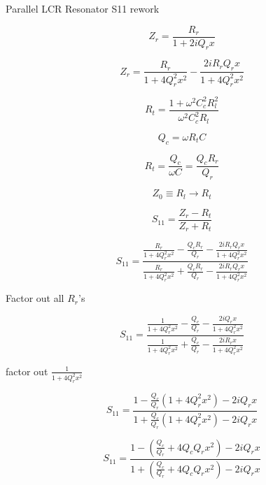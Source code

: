 \documentclass[12pt]{article}
\begin{document}
\setlength{\parindent}{0 pt}
\begin{center}
Parallel LCR Resonator S11 rework
\end{center}

\[
Z_{r} = \frac{R_{r}}{1 + 2iQ_r x}
\]

\[
Z_{r} = \frac{R_{r}}{1 + 4Q_r^2 x^2} - \frac{2 i R_r Q_r x}{1 + 4 Q_r^2 x^2}
\]

\[
R_t =\frac{1 + \omega^2 C_c^2 R_l^2}{\omega^2 C_c^2 R_l}
\]

\[
Q_c = \omega R_t C
\]

\[
R_t = \frac{Q_c}{\omega C} = \frac{Q_c R_{r}}{Q_{r}}
\]

\[
Z_0 \equiv R_l \rightarrow R_t
\]

\[
S_{11} = \frac{Z_{r} - R_t}{Z_{r} + R_t}
\]

\[
S_{11} = \frac{  \frac{R_{r}}{1 + 4Q_r^2 x^2} - \frac{Q_c R_{r}}{Q_{r}} - \frac{2 i R_r Q_r x}{1 + 4  Q_r^2 x^2}}{  \frac{R_{r}}{1 + 4Q_r^2 x^2} + \frac{Q_c R_{r}}{Q_{r}} - \frac{2 i R_r Q_r x}{1 + 4  Q_r^2 x^2}}
\]

Factor out all $R_r$'s

\[
S_{11} = \frac{  \frac{1}{1 + 4Q_r^2 x^2} - \frac{Q_c }{Q_{r}} - \frac{2 i  Q_r x}{1 + 4 Q_r^2 x^2}}{  \frac{1}{1 + 4Q_r^2 x^2} + \frac{Q_c }{Q_{r}} - \frac{2 i R_r  x}{1 + 4 Q_r^2 x^2}}
\]

factor out $\frac{1}{1 + 4Q_r^2 x^2}$

\[
S_{11} = \frac{1 - \frac{Q_c}{Q_r}(1 + 4Q_r^2 x^2) - 2iQ_r x}{1 + \frac{Q_c}{Q_r}(1 + 4Q_r^2 x^2) - 2iQ_r x}
\]

\[
S_{11} = \frac{1 - (\frac{Q_c}{Q_r} + 4Q_cQ_r x^2) - 2iQ_rx}{1 + (\frac{Q_c}{Q_r} + 4 Q_c Q_r x^2) - 2iQ_rx}
\]
\end{document}

